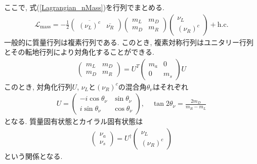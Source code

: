 ここで, 式(\ref{Lagrangian_nMass})を行列でまとめる.
\begin{eqnarray}
  \mathcal{L}_{\mathrm{mass}} = -\frac{1}{2}\left( 
  \begin{array}{cc}
    \overline{(\nu_L)^c} & \overline{\nu_R}
  \end{array}\right)
        \left( \begin{array}{cc}
        m_L & m_D \\
        m_D & m_R 
    \end{array}\right)
    \left( \begin{array}{c}
     \nu_L  \\
     (\nu_R)^c \end{array}\right)
     + \mathrm{h.c.}\label{Lagrangian_mt_nMass}
\end{eqnarray}
一般的に質量行列は複素行列である.
このとき, 複素対称行列はユニタリー行列とその転地行列により対角化することができる.
\begin{eqnarray}
  \left( \begin{array}{cc}
        m_L & m_D \\
        m_D & m_R 
    \end{array}\right)
 =
  U^T\left( \begin{array}{cc}
        m_a & 0 \\
          0 & m_s 
    \end{array}\right)U
\end{eqnarray}
このとき, 対角化行列$U$, $\nu_L$と$(\nu_R)^c$の混合角$\theta_\nu$はそれぞれ
\begin{eqnarray}
  U =\left(
  \begin{array}{cc}
        -i\cos\theta_\nu & \sin\theta_\nu  \\
         i\sin\theta_\nu & \cos\theta_\nu
     \end{array}\right),\quad \tan2\theta_\nu = \frac{2m_D}{m_R-m_L}
\end{eqnarray}
となる.
質量固有状態とカイラル固有状態は
\begin{eqnarray}
  \left(\begin{array}{c}
      \nu_a \\
      \nu_s
    \end{array}
    \right) = U^\dagger
  \left(\begin{array}{c}
      \nu_L \\
      (\nu_R)^c
    \end{array}
    \right)
\end{eqnarray}
という関係となる.

